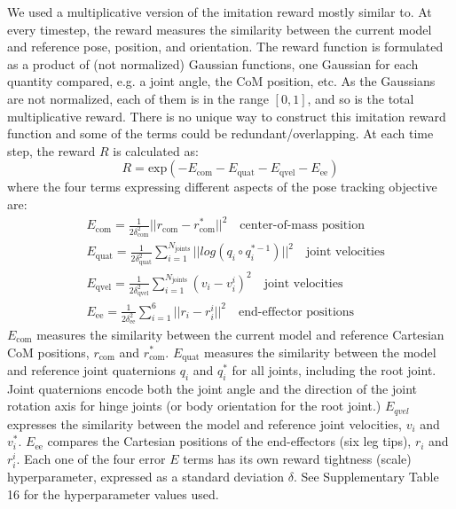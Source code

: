 \documentclass[sn-mathphys-num]{sn-jnl}%
\theoremstyle{thmstyleone}	%
\theoremstyle{thmstyletwo}	%
\theoremstyle{thmstylethree}	%
\begin{document}
\begin{appendices}
We used a multiplicative version of the imitation reward mostly similar to\cite{peng2018deepmimic,merel2020catch}. 
At every timestep, the reward measures the similarity between the current model and reference pose, position, and orientation. 
The reward function is formulated as a product of (not normalized) Gaussian functions, one Gaussian for each quantity compared, e.g. a joint angle, the CoM position, etc. 
As the Gaussians are not normalized, each of them is in the range $ [0, 1] $, and so is the total multiplicative reward. 
There is no unique way to construct this imitation reward function and some of the terms could be redundant/overlapping. At each time step, the reward $ R $ is calculated as:
\begin{equation}
	R = \text{exp} (
		- E_\text{com}
		- E_\text{quat}
		- E_\text{qvel}
		- E_\text{ee}
	)
\end{equation}
where the four terms expressing different aspects of the pose tracking objective are:
\begin{equation}\label{key}
	\begin{aligned}
		& E_\text{com} = \frac{1}{2 \delta_\text{com}^2} 
			|| r_\text{com} - r_\text{com}^{*} ||^2  \quad 
			\text{center-of-mass position} \\
		& E_\text{quat} = \frac{1}{2 \delta_\text{quat}^2} 
			\sum_{i=1}^{N_\text{joints}} || log(q_i \circ q_i^{*-1}) ||^2  \quad
			\text{joint velocities} \\
		& E_\text{qvel} = \frac{1}{2 \delta_\text{qvel}^2} 
			\sum_{i=1}^{N_\text{joints}}
			(v_i - v_i^{i})^2  \quad
			\text{joint velocities} \\
		& E_\text{ee} = 
			\frac{1}{2 \delta_\text{ee}^2}
			\sum_{i=1}^{6}
			|| r_i - r_i^{i} ||^2  \quad
			\text{end-effector positions}
	\end{aligned}
\end{equation}
$ E_\text{com} $ measures the similarity between the current model and reference Cartesian CoM positions, $ r_\text{com} $ and $ r_\text{com}^{*} $. 
$ E_\text{quat} $ measures the similarity between the model and reference joint quaternions $ q_i $ and $ q_i^{*} $ for all joints, including the root joint. 
Joint quaternions encode both the joint angle and the direction of the joint rotation axis for hinge joints (or body orientation for the root joint.) 
$ E_{qvel} $ expresses the similarity between the model and reference joint velocities, $ v_i $ and $ v_i^{*} $. 
$ E_\text{ee} $ compares the Cartesian positions of the end-effectors (six leg tips), $ r_i $ and $ r_i^{i} $. 
Each one of the four error $ E $ terms has its own reward tightness (scale) hyperparameter, expressed as a standard deviation $ \delta $. 
See Supplementary Table 16 for the hyperparameter values used.



\end{appendices}
\end{document}
